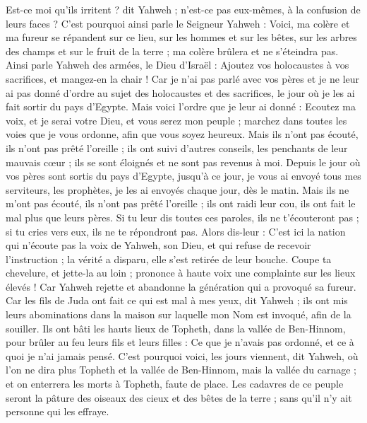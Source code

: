 \begin{multicols}{2}
Est-ce moi qu'ils irritent ? dit Yahweh ; n'est-ce pas eux-mêmes, à la confusion de leurs faces ?
C'est pourquoi ainsi parle le Seigneur Yahweh : Voici, ma colère et ma fureur se répandent sur ce lieu, sur les hommes et sur les bêtes, sur les arbres des champs et sur le fruit de la terre ; ma colère brûlera et ne s'éteindra pas.
Ainsi parle Yahweh des armées, le Dieu d'Israël : Ajoutez vos holocaustes à vos sacrifices, et mangez-en la chair !
Car je n'ai pas parlé avec vos pères et je ne leur ai pas donné d'ordre au sujet des holocaustes et des sacrifices, le jour où je les ai fait sortir du pays d'Egypte.
Mais voici l'ordre que je leur ai donné : Ecoutez ma voix, et je serai votre Dieu, et vous serez mon peuple ; marchez dans toutes les voies que je vous ordonne, afin que vous soyez heureux.
Mais ils n'ont pas écouté, ils n'ont pas prêté l'oreille ; ils ont suivi d'autres conseils, les penchants de leur mauvais cœur ; ils se sont éloignés et ne sont pas revenus à moi.
Depuis le jour où vos pères sont sortis du pays d'Egypte, jusqu'à ce jour, je vous ai envoyé tous mes serviteurs, les prophètes, je les ai envoyés chaque jour, dès le matin.
Mais ils ne m'ont pas écouté, ils n'ont pas prêté l'oreille ; ils ont raidi leur cou, ils ont fait le mal plus que leurs pères.
Si tu leur dis toutes ces paroles, ils ne t'écouteront pas ; si tu cries vers eux, ils ne te répondront pas.
Alors dis-leur : C'est ici la nation qui n'écoute pas la voix de Yahweh, son Dieu, et qui refuse de recevoir l'instruction ; la vérité a disparu, elle s'est retirée de leur bouche.
Coupe ta chevelure, et jette-la au loin ; prononce à haute voix une complainte sur les lieux élevés ! Car Yahweh rejette et abandonne la génération qui a provoqué sa fureur.
Car les fils de Juda ont fait ce qui est mal à mes yeux, dit Yahweh ; ils ont mis leurs abominations dans la maison sur laquelle mon Nom est invoqué, afin de la souiller.
Ils ont bâti les hauts lieux de Topheth, dans la vallée de Ben-Hinnom, pour brûler au feu leurs fils et leurs filles : Ce que je n'avais pas ordonné, et ce à quoi je n'ai jamais pensé.
C'est pourquoi voici, les jours viennent, dit Yahweh, où l'on ne dira plus Topheth et la vallée de Ben-Hinnom, mais la vallée du carnage ; et on enterrera les morts à Topheth, faute de place.
Les cadavres de ce peuple seront la pâture des oiseaux des cieux et des bêtes de la terre ; sans qu'il n'y ait personne qui les effraye.

\end{multicols}
